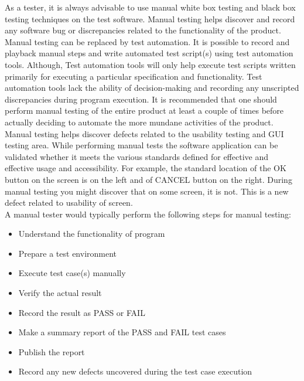 \hspace*{0.7in} As a tester, it is always advisable to use manual white box testing and black box testing techniques on the test software. Manual testing helps discover and record any software bug or discrepancies related to the functionality of the product.
\\
\hspace*{0.7in} Manual testing can be replaced by test automation. It is possible to record and playback manual steps and write automated test script(s) using test automation tools. Although, Test automation tools will only help execute test scripts written primarily for executing a particular specification and functionality. Test automation tools lack the ability of decision-making and recording any unscripted discrepancies during program execution. It is recommended that one should perform manual testing of the entire product at least a couple of times before actually deciding to automate the more mundane activities of the product.
\\
\hspace*{0.7in} Manual testing helps discover defects related to the usability testing and GUI testing area. While performing manual tests the software application can be validated whether it meets the various standards defined for effective and effective usage and accessibility. For example, the standard location of the OK button on the screen is on the left and of CANCEL button on the right. During manual testing you might discover that on some screen, it is not. This is a new defect related to usability of screen.
\\
\hspace*{0.3in} A manual tester would typically perform the following steps for manual testing:
\begin{itemize}
  \item  Understand the functionality of program
  \item	 Prepare a test environment
  \item  Execute test case(s) manually
  \item  Verify the actual result
  \item  Record the result as PASS or FAIL
  \item  Make a summary report of the PASS and FAIL test cases
  \item  Publish the report
  \item  Record any new defects uncovered during the test case execution
\end{itemize}

